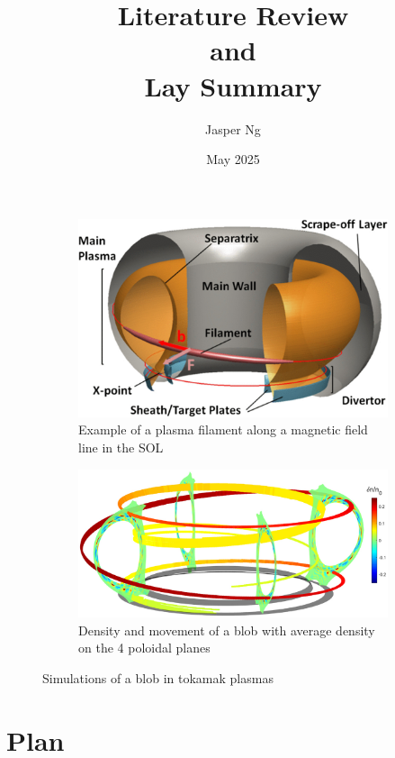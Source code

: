\documentclass{article}
\title{\textbf{Literature Review \\and \\Lay Summary}}
\author{Jasper Ng}
\date{May 2025}
\begin{document}
\maketitle

\begin{figure}[h]
    \centering
    \begin{subfigure}[c]{0.45\linewidth}
        \centering
        \includegraphics[width=0.9\linewidth]{Fig1_plasma_filament.png}
        \normalsize{\caption{Example of a plasma filament along a magnetic field line in the SOL \cite{carralero_experimental_2015}}}
        \label{fig:fig1}
    \end{subfigure}
    \hspace{0.05\linewidth}
    \begin{subfigure}[c]{0.45\linewidth}
        \centering
        \includegraphics[width=0.9\linewidth]{Fig2_blob_movement.png}
        \normalsize{\caption{Density and movement of a blob with average density on the 4 poloidal planes \cite{nespoli_3d_2019}}}
        \label{fig:fig2}
    \end{subfigure}
    \normalsize{\caption{Simulations of a blob in tokamak plasmas}}
\end{figure}

\section*{Plan}
\end{document}
